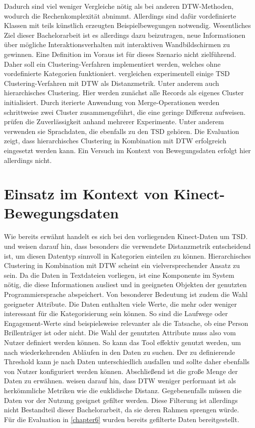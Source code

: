 Dadurch sind viel weniger Vergleiche nötig als bei anderen \ac{DTW}-Methoden,
wodurch die Rechenkomplexität abnimmt.
Allerdings sind dafür vordefinierte Klassen mit teils künstlich erzeugten Beispielbewegungen notwendig.
Wesentliches Ziel dieser Bachelorarbeit ist es allerdings dazu beizutragen, neue Informationen
über mögliche Interaktionsverhalten mit interaktiven Wandbildschirmen zu gewinnen.
Eine Definition im Voraus ist für dieses Szenario nicht zielführend.
Daher soll ein Clustering-Verfahren implementiert werden,
welches ohne vordefinierte Kategorien funktioniert.
\citet{hautamaki_time-series_2008} vergleichen experimentell einige \ac*{TSD} Clustering-Verfahren
mit \ac{DTW} als Distanzmetrik.
Unter anderem auch hierarchisches Clustering.
Hier werden zunächst alle Records als eigenes Cluster initialisiert.
Durch iterierte Anwendung von Merge-Operationen werden schrittweise zwei Cluster zusammengeführt,
die eine geringe Differenz aufweisen.
\citet{hautamaki_time-series_2008} prüfen die Zuverlässigkeit anhand mehrerer Experimente.
Unter anderem verwenden sie Sprachdaten, die ebenfalls zu den \ac{TSD} gehören.
Die Evaluation zeigt, dass hierarchisches Clustering in Kombination mit \ac{DTW} erfolgreich eingesetzt werden kann.
Ein Versuch im Kontext von Bewegungsdaten erfolgt hier allerdings nicht.

\section{Einsatz im Kontext von Kinect-Bewegungsdaten}
\label{3-Einsatz}
Wie bereits erwähnt handelt es sich bei den vorliegenden Kinect-Daten um \ac{TSD}.
\citet{warren_liao_clustering_2005} und \citet{aghabozorgi_time-series_2015} weisen darauf hin,
dass besonders die verwendete Distanzmetrik entscheidend ist,
um diesen Datentyp sinnvoll in Kategorien einteilen zu können.
Hierarchisches Clustering in Kombination mit \ac{DTW} scheint ein vielversprechender Ansatz zu sein.
Da die Daten in Textdateien vorliegen, ist eine Komponente im System nötig,
die diese Informationen ausliest und in geeigneten Objekten der genutzten Programmiersprache abspeichert.
Von besonderer Bedeutung ist zudem die Wahl geeigneter Attribute.
Die Daten enthalten viele Werte, die mehr oder weniger interessant für die Kategorisierung sein können.
So sind die Laufwege oder Engagement-Werte sind beispielsweise relevanter als die Tatsache,
ob eine Person Brillenträger ist oder nicht.
Die Wahl der genutzten Attribute muss also vom Nutzer definiert werden können.
So kann das Tool effektiv genutzt werden, um nach wiederkehrenden Abläufen in den Daten zu suchen.
Der zu definierende Threshold kann je nach Daten unterschiedlich ausfallen
und sollte daher ebenfalls von Nutzer konfiguriert werden können.
Abschließend ist die große Menge der Daten zu erwähnen.
\citet{aghabozorgi_time-series_2015} weisen darauf hin,
dass \ac{DTW} weniger performant ist als herkömmliche Metriken wie die euklidische Distanz.
Gegebenenfalls müssen die Daten vor der Nutzung geeignet gefilter werden.
Diese Filterung ist allerdings nicht Bestandteil dieser Bachelorarbeit,
da sie deren Rahmen sprengen würde.
Für die Evaluation in \autoref{chapter6} wurden bereits gefilterte Daten bereitgestellt.